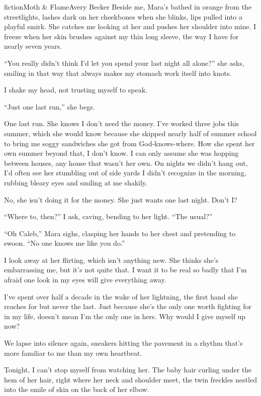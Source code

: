 \begin{prose}{fiction}{Moth \& Flame}{Avery Becker}
Beside me, Mara's bathed in orange from the streetlights, lashes dark on her cheekbones when she blinks, lips pulled into a playful smirk. She catches me looking at her and pushes her shoulder into mine. I freeze when her skin brushes against my thin long sleeve, the way I have for nearly seven years. \par
“You really didn't think I'd let you spend your last night all alone?” she asks, smiling in that way that always makes my stomach work itself into knots.\par
I shake my head, not trusting myself to speak. \par
“Just one last run,” she begs.\par
One last run. She knows I don't need the money. I've worked three jobs this summer, which she would know because she skipped nearly half of summer school to bring me soggy sandwiches she got from God-knows-where. How she spent her own summer beyond that, I don't know. I can only assume she was hopping between houses, any house that wasn't her own. On nights we didn't hang out, I'd often see her stumbling out of side yards I didn't recognize in the morning, rubbing bleary eyes and smiling at me shakily. \par
No, she isn't doing it for the money. She just wants one last night. Don't I?\par
“Where to, then?” I ask, caving, bending to her light. “The usual?”\par
“Oh Caleb,” Mara sighs, clasping her hands to her chest and pretending to swoon. “No one knows me like you do.” \par
I look away at her flirting, which isn't anything new. She thinks she's embarrassing me, but it's not quite that. I want it to be real so badly that I'm afraid one look in my eyes will give everything away.\par
I've spent over half a decade in the wake of her lightning, the first hand she reaches for but never the last. Just because she's the only one worth fighting for in my life, doesn't mean I'm the only one in hers. Why would I give myself up now?\par
We lapse into silence again, sneakers hitting the pavement in a rhythm that's more familiar to me than my own heartbeat. \par
Tonight, I can't stop myself from watching her. The baby hair curling under the hem of her hair, right where her neck and shoulder meet, the twin freckles nestled into the smile of skin on the back of her elbow.\par

\end{prose}
